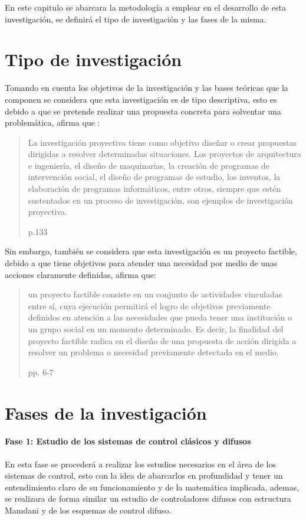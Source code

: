 En este capitulo se abarcara la metodología a emplear en el desarrollo de esta investigación, se definirá el tipo de investigación y las fases de la misma.

\section{Tipo de investigación}
	
	Tomando en cuenta los objetivos de la investigación y las bases teóricas que la componen se considera que esta investigación es de tipo descriptiva, esto es debido a que se pretende realizar una propuesta concreta para solventar una problemática, \textcite{jacquelin2010guia} afirma que :
	
	\blockquote[p.133]{La investigación proyectiva tiene como objetivo diseñar o crear propuestas dirigidas a resolver determinadas situaciones. Los proyectos de arquitectura e ingeniería, el diseño de maquinarias, la creación de programas de intervención social, el diseño de programas de estudio, los inventos, la elaboración de programas informáticos, entre otros, siempre que estén sustentados en un proceso de investigación, son ejemplos de investigación proyectiva.}

	
	Sin embargo, también se considera que esta investigación es un proyecto factible, debido a que tiene objetivos para atender una necesidad por medio de unas acciones claramente definidas, \textcite{renie2002factible} afirma que:
	
	\blockquote[pp. 6-7]{un proyecto factible consiste en un conjunto de actividades vinculadas entre sí, cuya ejecución permitirá el logro de objetivos previamente definidos en atención a las necesidades que pueda tener una institución o un grupo social en un momento determinado. Es decir, la finalidad del proyecto factible radica en el diseño de una propuesta de acción dirigida a resolver un problema o necesidad previamente detectada en el medio.}
	
\section{Fases de la investigación}
	
	\paragraph{Fase 1: Estudio de los sistemas de control clásicos y difusos}
		
		En esta fase se procederá a realizar los estudios necesarios en el área de los sistemas de control, esto con la idea de abarcarlos en profundidad y tener un entendimiento claro de su funcionamiento y de la matemática implicada, ademas, se realizara de forma similar un estudio de controladores difusos con estructura Mamdani y de los esquemas de control difuso.
		
